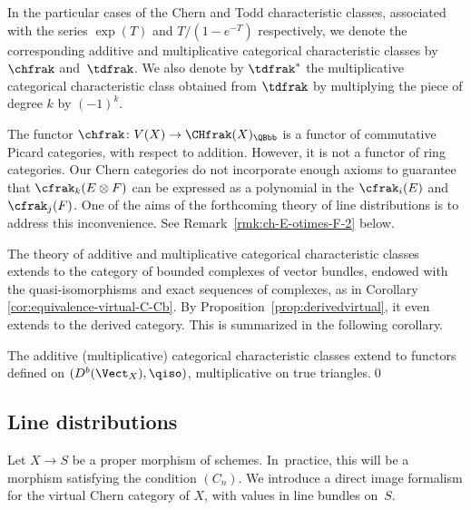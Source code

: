 \begin{definition}\label{def:ChernToddchar}
In the particular cases of the Chern and Todd characteristic classes, associated with the series $\exp(T)$ and $T/(1-e^{-T})$ respectively, we denote the corresponding additive and multiplicative categorical characteristic classes by~$\chfrak$ and~$\tdfrak$. We also denote by $\tdfrak^{*}$ the multiplicative categorical characteristic class obtained from $\tdfrak$ by multiplying the piece of degree $k$ by $(-1)^{k}$.
\end{definition}

\begin{remark}\label{rmk:ch-E-otimes-F}
The functor $\chfrak\colon V(X)\to\CHfrak(X)_{\QBbb}$ is a functor of commutative \hbox{Picard} categories, with respect to addition. However, it is not a functor of ring categories. Our Chern categories do not incorporate enough axioms to guarantee that $\cfrak_{k}(E\otimes F)$ can be expressed as a polynomial in the $\cfrak_{i}(E)$ and $\cfrak_{j}(F)$. One of the aims of the forthcoming theory of line distributions is to address this inconvenience. See Remark~\ref{rmk:ch-E-otimes-F-2} below.
\end{remark}

The theory of additive and multiplicative categorical characteristic classes extends to the category of bounded complexes of vector bundles, endowed with the quasi-isomorphisms and exact sequences of complexes, as in Corollary \ref{cor:equivalence-virtual-C-Cb}. By Proposition~\ref{prop:derivedvirtual}, it even extends to the derived category. This is summarized in the following corollary.

\begin{corollary}\label{cor:characteristic-derived}
The additive (\resp multiplicative) categorical characteristic classes extend to functors defined on $(D^b(\Vect_X), \qiso)$, multiplicative on true triangles.\qed
\end{corollary}

\subsection{Line distributions}\label{subsec:line-distributions}
Let $X\to S$ be a proper \fppf morphism of schemes. In~practice, this will be a morphism satisfying the condition $(C_{n})$. We introduce a direct image formalism for the virtual Chern category of $X$, with values in line bundles on~$S$.\enlargethispage{.5\baselineskip}%

